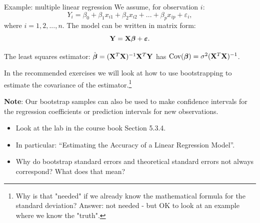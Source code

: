 \documentclass[
  10pt,
  ignorenonframetext,
]{beamer}
\providecommand{\tightlist}{%
  \setlength{\itemsep}{0pt}\setlength{\parskip}{0pt}}
\begin{document}
\begin{frame}
\begin{block}{Example: multiple linear regression}
\protect\hypertarget{example-multiple-linear-regression}{}
We assume, for observation \(i\):
\[Y_i= \beta_0 + \beta_{1}  x_{i1} + \beta_2 x_{i2} + ... + \beta_p x_{ip} + \varepsilon_i,\]
where \(i=1,2,...,n\). The model can be written in matrix form:
\[{\bf Y}={\bf X} \boldsymbol{\beta}+{\boldsymbol{\varepsilon}}.\]

The least squares estimator:
\(\hat{\boldsymbol\beta}=({\bf X}^T{\bf X})^{-1} {\bf X}^T {\bf Y}\) has
\(\text{Cov}(\boldsymbol\beta)=\sigma^2({\bf X}^T{\bf X})^{-1}\).

In the recommended exercises we will look at how to use bootstrapping to
estimate the covariance of the estimator.\footnote{
Why is that "needed" if we already know the mathematical formula for the standard deviation? Answer: not needed - but OK to look at an example where we know the "truth".}

\vspace{2mm}
\normalsize

\textbf{Note}: Our bootstrap samples can also be used to make confidence
intervals for the regression coefficients or prediction intervals for
new observations.
\end{block}
\end{frame}

\begin{frame}
\begin{itemize}
\tightlist
\item
  Look at the lab in the course book Section 5.3.4.
\end{itemize}

\vspace{2mm}

\begin{itemize}
\tightlist
\item
  In particular: ``Estimating the Accuracy of a Linear Regression
  Model''.
\end{itemize}

\vspace{2mm}

\begin{itemize}
\tightlist
\item
  Why do bootstrap standard errors and theoretical standard errors not
  always correspond? What does that mean?
\end{itemize}
\end{frame}
\end{document}
